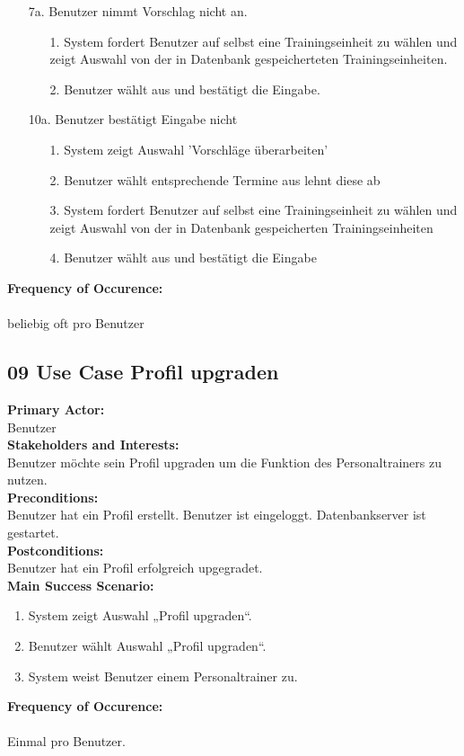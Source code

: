\documentclass[12pt,a4paper,onecolumn]{article}
\begin{document}
\begin{enumerate}
    \item [7a.]  Benutzer nimmt Vorschlag nicht an.
    \begin{enumerate}
        \item[1.]System fordert Benutzer auf selbst eine \gls{Trainingseinheit} zu wählen und zeigt Auswahl von der in Datenbank gespeicherteten \gls{Trainingseinheit}en.
        \item[2.]Benutzer wählt aus und bestätigt die Eingabe.
    \end{enumerate}
    \item [10a.] Benutzer bestätigt Eingabe nicht
     \begin{enumerate}
        \item[1.]System zeigt Auswahl 'Vorschläge überarbeiten'
        \item[2.]Benutzer wählt entsprechende Termine aus lehnt diese ab
        \item[3.]System fordert Benutzer auf selbst eine \gls{Trainingseinheit} zu wählen und zeigt Auswahl von der in Datenbank gespeicherten \gls{Trainingseinheit}en
        \item[4.]Benutzer wählt aus und bestätigt die Eingabe
    \end{enumerate}
\end{enumerate}
\textbf{Frequency of Occurence:}\\ \\
beliebig oft pro Benutzer

\subsection{09 Use Case Profil upgraden}
\textbf{Primary Actor:}\\ Benutzer\\
\textbf{Stakeholders and Interests:}\\
Benutzer möchte sein Profil upgraden um die Funktion des \gls{Personaltrainer}s zu nutzen.\\
\textbf{Preconditions:} \\ Benutzer hat ein Profil erstellt. 
Benutzer ist eingeloggt. Datenbankserver ist gestartet.\\
\textbf{Postconditions:}\\Benutzer hat ein Profil erfolgreich upgegradet.\\
\textbf{Main Success Scenario:}
\begin{enumerate}
    \item System zeigt Auswahl „Profil upgraden“.
    \item Benutzer wählt Auswahl „Profil upgraden“.
    \item System weist Benutzer einem \gls{Personaltrainer} zu.
\end{enumerate}
\textbf{Frequency of Occurence:}\\ \\
Einmal pro Benutzer.
\end{document}
